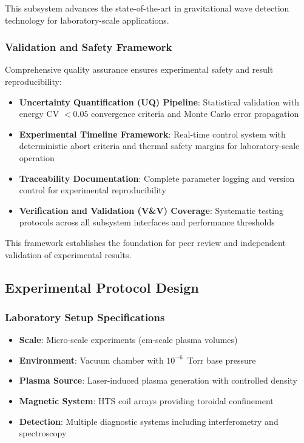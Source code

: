 \documentclass[12pt,a4paper]{article}
\begin{document}
This subsystem advances the state-of-the-art in gravitational wave detection technology for laboratory-scale applications.

\subsubsection{Validation and Safety Framework}

Comprehensive quality assurance ensures experimental safety and result reproducibility:

\begin{itemize}
\item \textbf{Uncertainty Quantification (UQ) Pipeline}: Statistical validation with energy CV $< 0.05$ convergence criteria and Monte Carlo error propagation
\item \textbf{Experimental Timeline Framework}: Real-time control system with deterministic abort criteria and thermal safety margins for laboratory-scale operation
\item \textbf{Traceability Documentation}: Complete parameter logging and version control for experimental reproducibility
\item \textbf{Verification and Validation (V\&V) Coverage}: Systematic testing protocols across all subsystem interfaces and performance thresholds
\end{itemize}

This framework establishes the foundation for peer review and independent validation of experimental results.

\subsection{Experimental Protocol Design}

\subsubsection{Laboratory Setup Specifications}
\begin{itemize}
\item \textbf{Scale}: Micro-scale experiments (cm-scale plasma volumes)
\item \textbf{Environment}: Vacuum chamber with $10^{-6}$~Torr base pressure
\item \textbf{Plasma Source}: Laser-induced plasma generation with controlled density
\item \textbf{Magnetic System}: HTS coil arrays providing toroidal confinement
\item \textbf{Detection}: Multiple diagnostic systems including interferometry and spectroscopy
\end{itemize}
\end{document}
